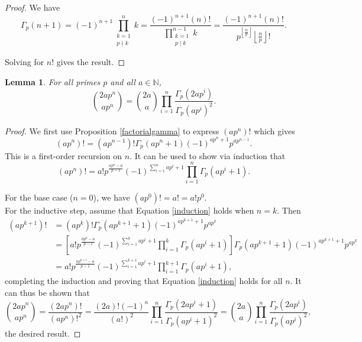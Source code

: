 \documentclass[12pt, letter]{article}    %
\theoremstyle{plain}
\newtheorem{lemma}[theorem]{Lemma}
\theoremstyle{definition}
\numberwithin{equation}{section}
\newcommand{\propref}[1]{Proposition \ref{#1}}
\newcommand{\eref}[1]{Equation \ref{#1}}
\newcommand{\thlabel}[1]{\label{#1}}
\providecommand{\floor}[1]{\left \lfloor #1 \right \rfloor }
\begin{document}
\begin{proof} We have
$$\Gamma_p(n+1) =(-1)^{n+1}\prod_{\substack{k=1\\p\nmid k}}^{n} k 
=\frac{(-1)^{n+1}(n)!}{\prod\limits_{\substack{k=1\\p\mid k}}^{n-1} k} 
=\frac{(-1)^{n+1}(n)!}{p^{\floor{\frac{n}{p}}}\floor{\frac{n}{p}}!}.$$

Solving for $n!$ gives the result.
\end{proof}

\begin{lemma}\thlabel{primepowerfactorial}
For all primes $p$ and all $a\in\mathbb{N}$, $$\binom{2ap^n}{ap^n}=\binom{2a}{a}\prod\limits_{i=1}^n \frac{\Gamma_p(2ap^i)}{\Gamma_p(ap^i)^2}.$$
\end{lemma}

\begin{proof}
We first use \propref{factorialgamma} to express $(ap^n)!$ which gives
\begin{equation}
(ap^n)!  = (ap^{n-1})!\Gamma_p(ap^n+1)(-1)^{ap^n+1}p^{ap^{n-1}}.
\end{equation}
This is a first-order recursion on $n$. It can be used to show via induction that 
\begin{equation}\label{induction}
(ap^n)! = a!p^{\frac{ap^n-a}{p-1}}(-1)^{\sum_{i=1}^{n}ap^i+1}\prod_{i=1}^{n}\Gamma_p(ap^i+1).
\end{equation}

For the base case ($n=0$), we have $(ap^0)!=a!=a!p^0$. \\

For the inductive step, assume that \eref{induction} holds when $n=k$. Then
\begin{equation*}
\begin{split}
(ap^{k+1})!&=(ap^k)!\Gamma_p(ap^{k+1}+1)(-1)^{ap^{k+1}+1}p^{ap^k}\\
&=\left[a!p^{\frac{ap^k-a}{p-1}}(-1)^{\sum_{i=1}^{k}ap^i+1}\prod_{i=1}^{k}\Gamma_p(ap^i+1)\right]\Gamma_p(ap^{k+1}+1)(-1)^{ap^{k+1}+1}p^{ap^k}\\
&= a!p^{\frac{ap^{k+1}-a}{p-1}}(-1)^{\sum_{i=1}^{k+1}ap^i+1}\prod_{i=1}^{k+1}\Gamma_p(ap^i+1), 
\end{split}
\end{equation*}
completing the induction and proving that \eref{induction} holds for all $n$. It can thus be shown that
$$\binom{2ap^n}{ap^n}=\frac{(2ap^n)!}{(ap^n)!^2}=\frac{(2a)!(-1)^{n}}{(a!)^2}\prod_{i=1}^n \frac{\Gamma_p(2ap^i+1)}{\Gamma_p(ap^i+1)^2}=\binom{2a}{a}\prod_{i=1}^n \frac{\Gamma_p(2ap^i)}{\Gamma_p(ap^i)^2},$$
the desired result.\end{proof}
\end{document}
